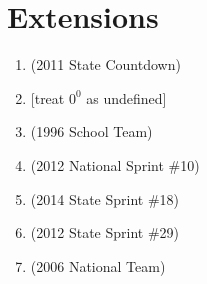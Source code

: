 \documentclass{article}
\begin{document}




\newpage

\section*{Extensions}
\vspace{1cm}
\begin{enumerate}
\item \underline{\hspace{3in}} (2011 State Countdown)\vspace{1cm}
\item \underline{\hspace{3in}} [treat $0^0$ as undefined]\vspace{1cm}
\item \underline{\hspace{3in}} (1996 School Team)\vspace{1cm}
\item \underline{\hspace{3in}} (2012 National Sprint \#10)\vspace{1cm}
\item \underline{\hspace{3in}} (2014 State Sprint \#18)\vspace{1cm}
\item \underline{\hspace{3in}} (2012 State Sprint \#29)\vspace{1cm}
\item \underline{\hspace{3in}} (2006 National Team)
\end{enumerate}
\end{document}
